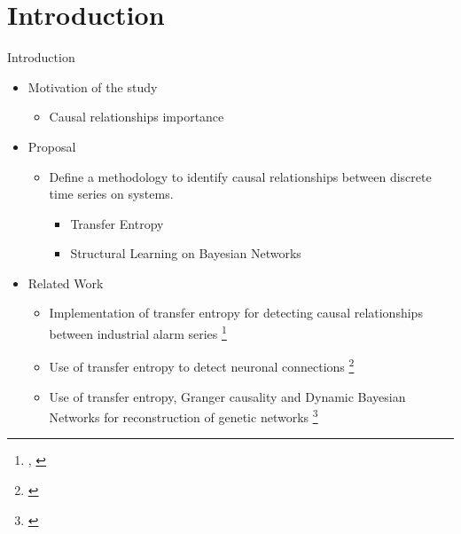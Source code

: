 \section{Introduction}

\begin{frame}{Introduction}


    \begin{itemize}
        \item Motivation of the study
        \begin{itemize}
            \item Causal relationships importance
        \end{itemize}
        
        \item Proposal
            \begin{itemize}
            \item Define a methodology to identify causal relationships between discrete time series on systems.
                \begin{itemize}
                    \item Transfer Entropy
                    \item Structural Learning on Bayesian Networks
                \end{itemize}
            \end{itemize}
            
        \item Related Work
            \begin{itemize}
                \item {Implementation of transfer entropy for detecting causal relationships between industrial alarm series \footnote{
                \cite{su2017capturing} 
                \cite{hu2017cause},
                \cite{yu2015detection}}}
                
                \item {Use of transfer entropy to detect neuronal connections \footnote{\cite{vicente2011transfer}}}
                
                \item {Use of transfer entropy, Granger causality and Dynamic Bayesian Networks for reconstruction of genetic networks \footnote{
                \cite{tung2007inferring}
                \cite{zou2009granger}}}
                
                
            \end{itemize}
    \end{itemize}

\end{frame}